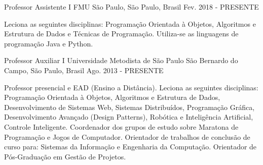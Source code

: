 

\begin{cventries}

  \cventry
    {Professor Assistente I} %
    {FMU} %
    {São Paulo, São Paulo, Brasil} %
    {Fev. 2018 - PRESENTE} %
    {
      \begin{cvitems} %
        \item {Leciona as seguintes disciplinas: Programação Orientada à Objetos, Algoritmos e Estrutura de Dados e Técnicas de Programação. Utiliza-se as linguagens de programação Java e Python.}
      \end{cvitems}
    }

  \cventry
    {Professor Auxiliar I} %
    {Universidade Metodista de São Paulo} %
    {São Bernardo do Campo, São Paulo, Brasil} %
    {Ago. 2013 - PRESENTE} %
    {
      \begin{cvitems} %
        \item {Professor presencial e EAD (Ensino a Distância). Leciona as seguintes disciplinas: Programação Orientada à Objetos, Algoritmos e Estrutura de Dados, Desenvolvimento de Sistemas Web, Sistemas Distribuídos, Programação Gráfica, Desenvolvimento Avançado (Design Patterns), Robótica e Inteligência Artificial, Controle Inteligente. Coordenador dos grupos de estudo sobre Maratona de Programação e Jogos de Computador. Orientador de trabalhos de conclusão de curso para: Sistemas da Informação e Engenharia da Computação. Orientador de Pós-Graduação em Gestão de Projetos.}
      \end{cvitems}
    }


\end{cventries}
